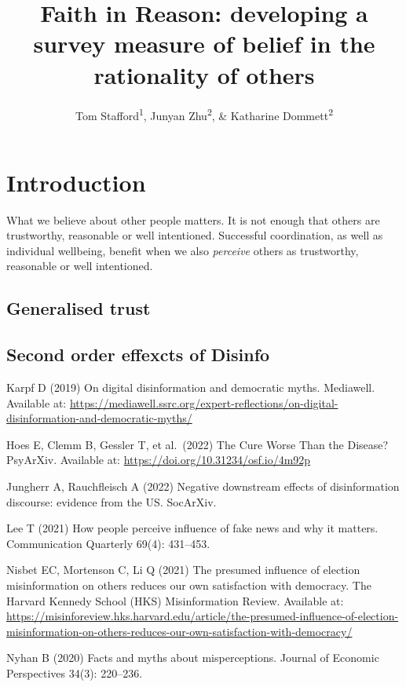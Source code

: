 \documentclass[
  ,jou,floatsintext]{apa6}
\title{Faith in Reason: developing a survey measure of belief in the rationality of others}
\author{Tom Stafford\textsuperscript{1}, Junyan Zhu\textsuperscript{2}, \& Katharine Dommett\textsuperscript{2}}
\date{}
\affiliation{\vspace{0.5cm}\textsuperscript{1} Department of Psychology, University of Sheffield, UK\\\textsuperscript{2} Department of Politics and International Relations, University of Sheffield, UK}
\begin{document}
\maketitle

\hypertarget{introduction}{%
\section{Introduction}\label{introduction}}

What we believe about other people matters. It is not enough that others are trustworthy, reasonable or well intentioned. Successful coordination, as well as individual wellbeing, benefit when we also \emph{perceive} others as trustworthy, reasonable or well intentioned.

\hypertarget{generalised-trust}{%
\subsection{Generalised trust}\label{generalised-trust}}

\hypertarget{second-order-effexcts-of-disinfo}{%
\subsection{Second order effexcts of Disinfo}\label{second-order-effexcts-of-disinfo}}

Karpf D (2019) On digital disinformation and democratic myths. Mediawell. Available at: \url{https://mediawell.ssrc.org/expert-reflections/on-digital-disinformation-and-democratic-myths/}

Hoes E, Clemm B, Gessler T, et al.~(2022) The Cure Worse Than the Disease? PsyArXiv. Available at: \url{https://doi.org/10.31234/osf.io/4m92p}

Jungherr A, Rauchfleisch A (2022) Negative downstream effects of disinformation discourse: evidence from the US. SocArXiv.

Lee T (2021) How people perceive influence of fake news and why it matters. Communication Quarterly 69(4): 431--453.

Nisbet EC, Mortenson C, Li Q (2021) The presumed influence of election misinformation on others reduces our own satisfaction with democracy. The Harvard Kennedy School (HKS) Misinformation Review. Available at: \url{https://misinforeview.hks.harvard.edu/article/the-presumed-influence-of-election-misinformation-on-others-reduces-our-own-satisfaction-with-democracy/}

Nyhan B (2020) Facts and myths about misperceptions. Journal of Economic Perspectives 34(3): 220--236.
\end{document}
